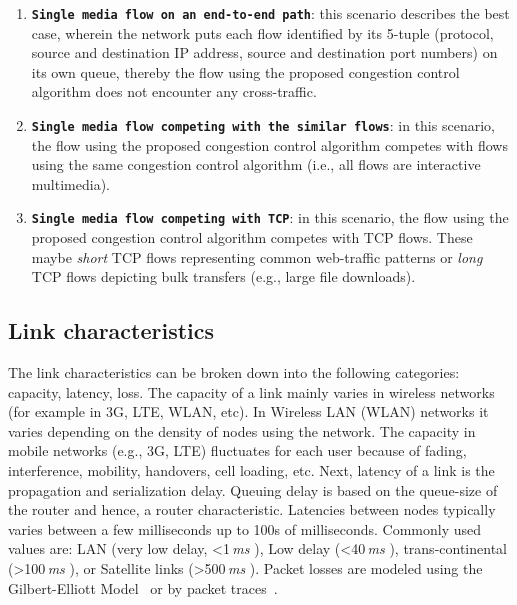 \begin{enumerate}
\setlength{\itemsep}{0pt}

\item \textbf{\texttt{Single media flow on an end-to-end path}}: this scenario
describes the best case, wherein the network puts each flow identified by its
5-tuple (protocol, source and destination IP address, source and destination
port numbers) on its own queue, thereby the flow using the proposed congestion
control algorithm does not encounter any cross-traffic.

\item \textbf{\texttt{Single media flow competing with the similar flows}}: in
this scenario, the flow using the proposed congestion control algorithm
competes with flows using the same congestion control algorithm (i.e., all
flows are interactive multimedia).


\item \textbf{\texttt{Single media flow competing with TCP}}: in this
scenario, the flow using the proposed congestion control algorithm competes
with TCP flows. These maybe \emph{short} TCP flows representing common
web-traffic patterns or \emph{long} TCP flows depicting bulk transfers (e.g.,
large file downloads).

\end{enumerate}





\subsection*{Link characteristics}

The link characteristics can be broken down into the following categories:
capacity, latency, loss. The capacity of a link mainly varies in wireless
networks (for example in 3G, LTE, WLAN, etc). In Wireless LAN (WLAN) networks
it varies depending on the density of nodes using the network. The capacity in
mobile networks (e.g., 3G, LTE) fluctuates for each user because of fading,
interference, mobility, handovers, cell loading, etc. Next, latency of a link
is the propagation and serialization delay. Queuing delay is based on the
queue-size of the router and hence, a router characteristic. Latencies between
nodes typically varies between a few milliseconds up to 100s of milliseconds.
Commonly used values are: LAN (very low delay, <1\,\emph{ms} ), Low delay
(<40\,\emph{ms} ), trans-continental (>100\,\emph{ms} ), or Satellite links
(>500\,\emph{ms} ). Packet losses are modeled using the Gilbert-Elliott
Model~\cite{gilbert1960capacity, elliott1963estimates} or by packet
traces~\cite{ellis:2011:dataset, 3gppSim}.


